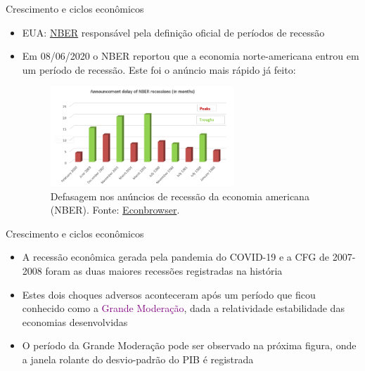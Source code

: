 \documentclass[10pt]{beamer}
\begin{document}
\begin{frame}{Crescimento e ciclos econômicos}
    \begin{itemize}
        \item EUA: \href{https://www.nber.org}{NBER} responsável pela definição oficial de períodos de recessão
         
        \item Em 08/06/2020 o NBER reportou que a economia norte-americana entrou em um período de recessão. Este foi o anúncio mais rápido já feito:
        \begin{figure}
            \centering
            \includegraphics[width=0.65\textwidth]{./figures/aula5_fig4.PNG}
            \caption{Defasagem nos anúncios de recessão da economia americana (NBER). Fonte: \href{http://econbrowser.com/archives/2020/06/guest-contribution-a-severe-us-recession}{Econbrowser}.}
            \label{aula5_fig4}
        \end{figure}
    \end{itemize}
\end{frame}

\begin{frame}{Crescimento e ciclos econômicos}
    \begin{itemize}
        \item A recessão econômica gerada pela pandemia do COVID-19 e a CFG de 2007-2008 foram as duas maiores recessões registradas na história\bigskip
         
        \item Estes dois choques adversos aconteceram após um período que ficou conhecido como a \textcolor{purple}{Grande Moderação}, dada a relatividade estabilidade das economias desenvolvidas\bigskip
         
        \item O período da Grande Moderação pode ser observado na próxima figura, onde a janela rolante do desvio-padrão do PIB é registrada
    \end{itemize}    
\end{frame}
\end{document}

